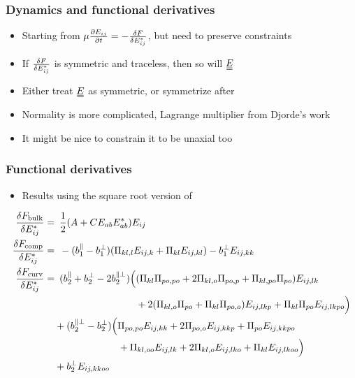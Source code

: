 \documentclass[10pt]{beamer}
\begin{document}
\begin{frame}
\frametitle{Dynamics and functional derivatives}
\begin{itemize}
    \item Starting from $\mu \pdv{E_{ij}}{t} = -\fdv{F}{E_{ij}^*}$, but need to preserve constraints
    \item If $\fdv{F}{E_{ij}^*}$ is symmetric and traceless, then so will $\du{E}$
    \item Either treat $\du{E}$ as symmetric, or symmetrize after
    \item Normality is more complicated, Lagrange multiplier from Djorde's work
    \item It might be nice to constrain it to be unaxial too
\end{itemize}
\end{frame}

\begin{frame}
\frametitle{Functional derivatives}
\begin{itemize}
    \item Results using the square root version of \PP
\end{itemize}
\begin{align*}
    \fdv{F_\text{bulk}}{E_{ij}^*} =&\enspace \frac{1}{2}\qty(A + C E_{ab}E_{ab}^*)E_{ij} \\
    \fdv{F_\text{comp}}{E_{ij}^*} =&\enspace -(b_1^\parallel - b_1^\perp) (\Pi_{kl,l} E_{ij,k} + \Pi_{kl} E_{ij,kl}) - b_1^\perp E_{ij,kk} \\
    \fdv{F_\text{curv}}{E_{ij}^*} =&\enspace (b_2^\parallel + b_2^\perp - 2b_2^{\parallel\perp}) \Bigl( (\Pi_{kl}\Pi_{po,po} + 2\Pi_{kl,o}\Pi_{po,p} + \Pi_{kl,po}\Pi_{po})E_{ij,lk} \\
    &\phantom{\enspace (b_2^\parallel + b_2^\perp - 2b_2^{\parallel\perp}) \Bigl(}+ 2(\Pi_{kl,o}\Pi_{po} + \Pi_{kl}\Pi_{po,o})E_{ij,lkp} + \Pi_{kl}\Pi_{po}E_{ij,lkpo} \Bigr) \nonumber \\
    &+ (b_2^{\parallel\perp} - b_2^\perp)\Bigl( \Pi_{po,po}E_{ij,kk} + 2\Pi_{po,o}E_{ij,kkp} + \Pi_{po}E_{ij,kkpo} \nonumber \\ 
    &\phantom{\enspace+ (b_2^{\parallel\perp} - b_2^\perp)\Bigl(}+ \Pi_{kl,oo}E_{ij,lk} + 2\Pi_{kl,o}E_{ij,lko} + \Pi_{kl}E_{ij,lkoo} \Bigr) \nonumber \\ 
    &+ b_2^\perp E_{ij,kkoo} \nonumber
\end{align*}
\end{frame}
\end{document}
